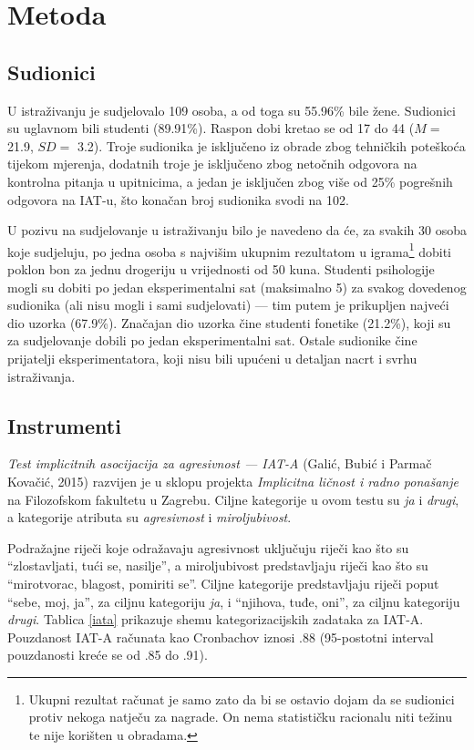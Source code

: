 \documentclass[a4paper, 12pt]{report}
\begin{document}
\section{Metoda}

\subsection{Sudionici}
U istraživanju je sudjelovalo 109 osoba, a od toga su 55.96\% bile žene.
Sudionici su uglavnom bili studenti (89.91\%). Raspon dobi kretao se od 17 do
44 ($M =$ 21.9, $SD =$ 3.2). Troje sudionika je isključeno iz obrade zbog
tehničkih poteškoća tijekom mjerenja, dodatnih troje je isključeno zbog
netočnih odgovora na kontrolna pitanja u upitnicima, a jedan je isključen zbog
više od 25\% pogrešnih odgovora na IAT-u, što konačan broj sudionika svodi na
102.

U pozivu na sudjelovanje u istraživanju bilo je navedeno da će, za svakih 30
osoba koje sudjeluju, po jedna osoba s najvišim ukupnim rezultatom u igrama\footnote{Ukupni
 rezultat računat je samo zato da bi se ostavio dojam da se
    sudionici protiv nekoga natječu za nagrade. On nema statističku racionalu
    niti težinu te nije korišten u obradama.}
dobiti poklon bon za jednu drogeriju u vrijednosti od 50 kuna.
Studenti psihologije mogli su
dobiti po jedan eksperimentalni sat (maksimalno 5) za svakog dovedenog
sudionika (ali nisu mogli i sami sudjelovati) --- tim putem je prikupljen
najveći dio uzorka (67.9\%). Značajan dio uzorka
čine studenti fonetike (21.2\%), koji su za sudjelovanje dobili po jedan
eksperimentalni sat. Ostale sudionike čine prijatelji eksperimentatora, koji
nisu bili upućeni u detaljan nacrt i svrhu istraživanja. 

\subsection{Instrumenti}

\emph{Test implicitnih asocijacija za agresivnost --- IAT-A} (Galić, Bubić i
    Parmač Kovačić, 2015)
razvijen je u sklopu projekta
\emph{Implicitna ličnost i radno ponašanje} na Filozofskom fakultetu u Zagrebu.
Ciljne kategorije u ovom testu su \emph{ja} i \emph{drugi}, a kategorije
atributa su \emph{agresivnost} i \emph{miroljubivost}. 

Podražajne riječi koje odražavaju agresivnost uključuju riječi kao što su
\enquote{zlostavljati, tući se, nasilje}, a miroljubivost predstavljaju
riječi kao što su \enquote{mirotvorac,
    blagost, pomiriti se}.
Ciljne kategorije predstavljaju riječi poput \enquote{sebe, moj, ja}, za ciljnu
kategoriju \emph{ja}, i \enquote{njihova, tuđe, oni}, za ciljnu kategoriju
\emph{drugi}. Tablica \ref{iata} prikazuje shemu kategorizacijskih zadataka
za IAT-A. Pouzdanost IAT-A računata kao Cronbachov {\textalpha} iznosi .88
(95-postotni interval pouzdanosti kreće se od .85 do .91).
\end{document}
